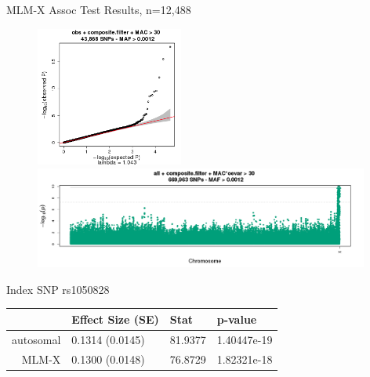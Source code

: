 \documentclass{beamer}
\begin{document}
\begin{frame}{MLM-X Assoc Test Results, n=12,488}
\centering
\begin{figure}
\includegraphics[height=4.6cm]{../RBC_MLM-X_results/pval_qq_filtered_2015-02-27_11-42-21___316987_v2.png}\\
\includegraphics[width=11cm]{../RBC_MLM-X_results/pval_manh_single_2015-02-27_11-42-21___316987_v2.png}
\end{figure}
\end{frame}

\begin{frame}{Index SNP rs1050828}
\begin{table}[ht]
\centering
\begin{tabular}{r|lll}
  \hline
 & Effect Size (SE) & Stat & p-value \\ 
  \hline
autosomal & 0.1314 (0.0145) & 81.9377 & 1.40447e-19 \\ 
MLM-X & 0.1300 (0.0148) & 76.8729 & 1.82321e-18 \\ 
 \hline
\end{tabular}
\end{table}
\end{frame}
\end{document}
